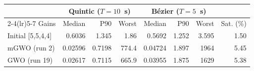 \begin{tabular}{lrrrrrrr}
\toprule
 & \multicolumn{3}{c}{Quintic ($T=10$~s)} & \multicolumn{3}{c}{B\'ezier ($T=5$~s)} & \\
\cmidrule(lr){2-4}\cmidrule(lr){5-7}
Gains & Median & P90 & Worst & Median & P90 & Worst & Sat. (\%) \\
\midrule
Initial [5,5,4,4] & 0.6036 & 1.345 & 1.86 & 0.5692 & 1.252 & 3.595 & 1.50 \\
mGWO (run 2) & 0.02596 & 0.7198 & 774.4 & 0.04724 & 1.897 & 1964 & 5.45 \\
GWO (run 19) & 0.02617 & 0.7115 & 665.9 & 0.03955 & 1.875 & 1629 & 5.38 \\
\bottomrule
\end{tabular}
